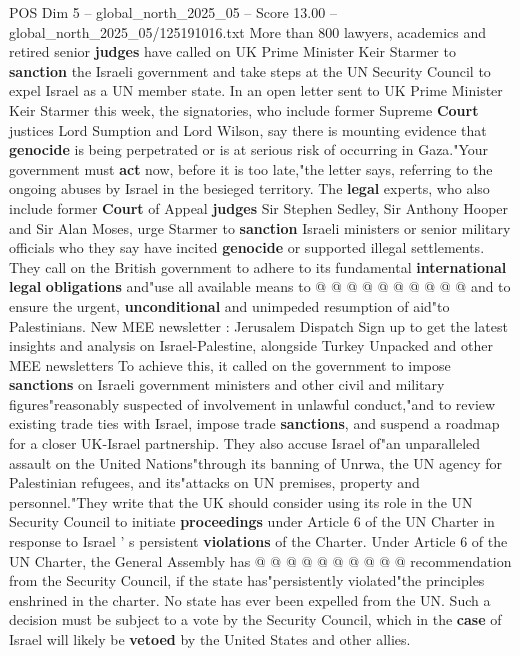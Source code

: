 \begin{textsample}{POS Dim 5 – global\_north\_2025\_05 – Score 13.00 – global\_north\_2025\_05/125191016.txt}  \label{ex:f5_pos_137}
More than 800 lawyers, academics and retired senior \textbf{judges} have called on UK Prime Minister Keir Starmer to \textbf{sanction} the Israeli government and take steps at the UN Security Council to expel Israel as a UN member state.
In an open letter sent to UK Prime Minister Keir Starmer this week, the signatories, who include former Supreme \textbf{Court} justices Lord Sumption and Lord Wilson, say there is mounting evidence that \textbf{genocide} is being perpetrated or is at serious risk of occurring in Gaza."Your government must \textbf{act} now, before it is too late,"the letter says, referring to the ongoing abuses by Israel in the besieged territory.
The \textbf{legal} experts, who also include former \textbf{Court} of Appeal \textbf{judges} Sir Stephen Sedley, Sir Anthony Hooper and Sir Alan Moses, urge Starmer to \textbf{sanction} Israeli ministers or senior military officials who they say have incited \textbf{genocide} or supported illegal settlements.
They call on the British government to adhere to its fundamental \textbf{international} \textbf{legal} \textbf{obligations} and"use all available means to @ @ @ @ @ @ @ @ @ @ and to ensure the urgent, \textbf{unconditional} and unimpeded resumption of aid"to Palestinians.
New MEE newsletter : Jerusalem Dispatch Sign up to get the latest insights and analysis on Israel-Palestine, alongside Turkey Unpacked and other MEE newsletters To achieve this, it called on the government to impose \textbf{sanctions} on Israeli government ministers and other civil and military figures"reasonably suspected of involvement in unlawful conduct,"and to review existing trade ties with Israel, impose trade \textbf{sanctions}, and suspend a roadmap for a closer UK-Israel partnership.
They also accuse Israel of"an unparalleled assault on the United Nations"through its banning of Unrwa, the UN agency for Palestinian refugees, and its"attacks on UN premises, property and personnel."They write that the UK should consider using its role in the UN Security Council to initiate \textbf{proceedings} under Article 6 of the UN Charter in response to Israel ' s persistent \textbf{violations} of the Charter.
Under Article 6 of the UN Charter, the General Assembly has @ @ @ @ @ @ @ @ @ @ recommendation from the Security Council, if the state has"persistently violated"the principles enshrined in the charter.
No state has ever been expelled from the UN.
Such a decision must be subject to a vote by the Security Council, which in the \textbf{case} of Israel will likely be \textbf{vetoed} by the United States and other allies.

\end{textsample}
